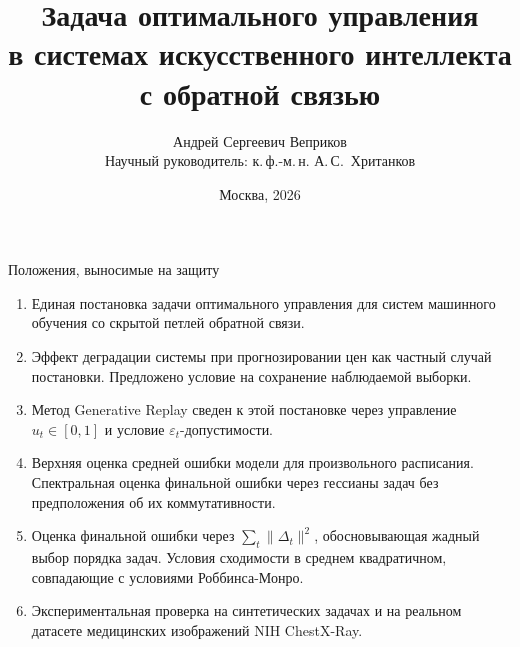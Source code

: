 \documentclass{beamer}
\title[\hbox to 56mm{Задача оптимального управления в системах ИИ с обратной связью}]{Задача оптимального управления\\ в системах искусственного интеллекта\\ с обратной связью}
\author[А.\,С.~Веприков]{Андрей Сергеевич Веприков\\
\small Научный руководитель: к.\,ф.-м.\,н. А.\,С.~Хританков}
\institute{Кафедра интеллектуальных систем ФПМИ МФТИ\\
Специализация: Интеллектуальный анализ данных}
\date{Москва, 2026}
\begin{document}
\begin{frame}
\thispagestyle{empty}
\maketitle
\end{frame}

\begin{frame}{Положения, выносимые на защиту}
    \small
    \begin{enumerate}
        \item Единая постановка задачи оптимального управления для систем машинного обучения со скрытой петлей обратной связи.
        \item Эффект деградации системы при прогнозировании цен как частный случай постановки. Предложено условие на сохранение наблюдаемой выборки.
        \item Метод Generative Replay сведен к этой постановке через управление $u_t \in [0, 1]$ и условие $\varepsilon_t$-допустимости.
        \item Верхняя оценка средней ошибки модели для произвольного расписания. Спектральная оценка финальной ошибки через гессианы задач без предположения об их коммутативности.
        \item Оценка финальной ошибки через $\sum_t \|\Delta_t\|^2$, обосновывающая жадный выбор порядка задач. Условия сходимости в среднем квадратичном, совпадающие с условиями Роббинса-Монро.
        \item Экспериментальная проверка на синтетических задачах и на реальном датасете медицинских изображений NIH ChestX-Ray.
    \end{enumerate}
\end{frame}
\end{document}
